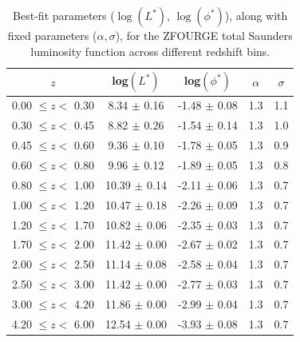 \begin{table}[h]
    \caption{Best-fit parameters ($\log(L^*)$, $\log(\phi^*)$), along with fixed parameters ($\alpha, \sigma$), for the ZFOURGE total Saunders luminosity function across different redshift bins.}
    \label{Tab: Param Evo ZF}
    \begin{center}
    \begin{tabular}{ccccc}
        \toprule
        $z$ & log$(L^{*})$ & log$(\phi^{*})$ & $\alpha$ & $\sigma$ \\
        \hline
        0.00 $\leq z <$ 0.30 &  8.34 $\pm$ 0.16 & -1.48 $\pm$ 0.08 & 1.3 & 1.1 \\
        0.30 $\leq z <$ 0.45 &  8.82 $\pm$ 0.26 & -1.54 $\pm$ 0.14 & 1.3 & 1.0 \\
        0.45 $\leq z <$ 0.60 &  9.36 $\pm$ 0.10 & -1.78 $\pm$ 0.05 & 1.3 & 0.9 \\
        0.60 $\leq z <$ 0.80 &  9.96 $\pm$ 0.12 & -1.89 $\pm$ 0.05 & 1.3 & 0.8 \\
        0.80 $\leq z <$ 1.00 & 10.39 $\pm$ 0.14 & -2.11 $\pm$ 0.06 & 1.3 & 0.7 \\
        1.00 $\leq z <$ 1.20 & 10.47 $\pm$ 0.18 & -2.26 $\pm$ 0.09 & 1.3 & 0.7 \\
        1.20 $\leq z <$ 1.70 & 10.82 $\pm$ 0.06 & -2.35 $\pm$ 0.03 & 1.3 & 0.7 \\
        1.70 $\leq z <$ 2.00 & 11.42 $\pm$ 0.00 & -2.67 $\pm$ 0.02 & 1.3 & 0.7 \\
        2.00 $\leq z <$ 2.50 & 11.14 $\pm$ 0.08 & -2.58 $\pm$ 0.04 & 1.3 & 0.7 \\
        2.50 $\leq z <$ 3.00 & 11.42 $\pm$ 0.00 & -2.77 $\pm$ 0.03 & 1.3 & 0.7 \\
        3.00 $\leq z <$ 4.20 & 11.86 $\pm$ 0.00 & -2.99 $\pm$ 0.04 & 1.3 & 0.7 \\
        4.20 $\leq z <$ 6.00 & 12.54 $\pm$ 0.00 & -3.93 $\pm$ 0.08 & 1.3 & 0.7      
        \botrule
    \end{tabular}
    \end{center}
\end{table}

